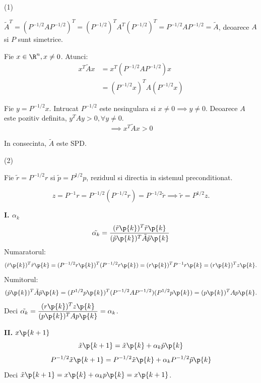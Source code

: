 \begin{demonstratie}

    \noindent (1)

    $\tilde{A}^{T} = (P^{-1/2} A P^{-1/2})^T = (P^{-1/2})^{T} A^{T} (P^{-1/2})^{T} = P^{-1/2} A P^{-1/2} = \tilde{A} $, deoarece $ A $ si $ P $ sunt simetrice.

    \smallskip

    Fie $x \in \R^n, x \neq 0$. Atunci:
    \begin{align*}
        x^T \tilde{A} x &= x^T (P^{-1/2} A P^{-1/2}) x \\
        &= (P^{-1/2} x)^T A (P^{-1/2} x)
    \end{align*}

    Fie $y = P^{-1/2} x$. Intrucat $P^{-1/2}$ este nesingulara si $x \neq 0 \implies y \neq 0$. Deoarece $A$ este pozitiv definita, $y^T A y > 0, \forall y \neq 0$.
    $$ \implies x^T \tilde{A} x > 0 $$

    In consecinta, $ \tilde{A} $ este SPD.

    \bigskip

    \noindent (2)

    Fie $ \tilde{r} = P^{-1/2}r$ si $ \tilde{p} = P^{1/2}p $, reziduul si directia in sistemul preconditionat. 
    \begin{observatie}
    $$ z = P^{-1}r = P^{-1/2}(P^{-1/2}r) = P^{-1/2}\tilde{r} \implies \tilde{r} = P^{1/2}z. $$
    \end{observatie}

    \medskip

    \textbf{I. $\alpha_k$} \\
    $$ \tilde{\alpha_k} = \frac{(\tilde{r}\p{k})^T \tilde{r}\p{k}}{(\tilde{p}\p{k})^T \tilde{A} \tilde{p}\p{k}} $$
    Numaratorul:
    $$ (\tilde{r}\p{k})^T \tilde{r}\p{k} = (P^{-1/2}r\p{k})^T (P^{-1/2}r\p{k}) = (r\p{k})^T P^{-1} r\p{k} = (r\p{k})^T z\p{k}. $$
    Numitorul:
    $$ (\tilde{p}\p{k})^T \tilde{A} \tilde{p}\p{k} = (P^{1/2}p\p{k})^T (P^{-1/2} A P^{-1/2}) (P^{1/2}p\p{k}) = (p\p{k})^T A p\p{k}. $$
    Deci $\displaystyle \tilde{\alpha_k} = \frac{(r\p{k})^T z\p{k}}{(p\p{k})^T A p\p{k}} = \alpha_k $.

    \bigskip

    \textbf{II. $x\p{k + 1}$} \\
    $$ 
    \tilde{x}\p{k+1} = \tilde{x}\p{k} + \alpha_k \tilde{p}\p{k}
    $$
    $$
    P^{-1/2}\tilde{x}\p{k+1} = P^{-1/2}\tilde{x}\p{k} + \alpha_k P^{-1/2}\tilde{p}\p{k} 
    $$
    Deci $ \tilde{x}\p{k+1} = x\p{k} + \alpha_k p\p{k} = x\p{k + 1}$.


\end{demonstratie}
